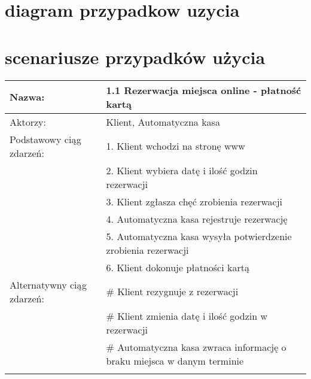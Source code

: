 


\newpage
\section{diagram przypadkow uzycia}
\begin{figure}
\vspace{-2cm}

\end{figure}

\newpage
\section{scenariusze przypadków użycia}
\begin{center}
\begin{tabular}{|L{3cm}  L{13cm}|}
\hline
Nazwa: & 1.1 Rezerwacja miejsca online - płatność kartą \\ \hline
Aktorzy: & Klient,  Automatyczna kasa \\ \hline
Podstawowy ciąg zdarzeń: & 1. Klient wchodzi na stronę www \\
 & 2. Klient wybiera datę i ilość godzin rezerwacji \\
 & 3. Klient zgłasza chęć zrobienia rezerwacji \\
 & 4. Automatyczna kasa rejestruje rezerwację \\
 & 5. Automatyczna kasa wysyła potwierdzenie zrobienia rezerwacji \\
 & 6. Klient dokonuje płatności kartą \\ \hline
Alternatywny ciąg zdarzeń:  & \# Klient rezygnuje z rezerwacji \\
 & \# Klient zmienia datę i ilość godzin w rezerwacji \\
 & \# Automatyczna kasa zwraca informację o braku miejsca w danym terminie\\ 
 \\ \hline
\end{tabular}

\vspace{1cm}


\end{center}
